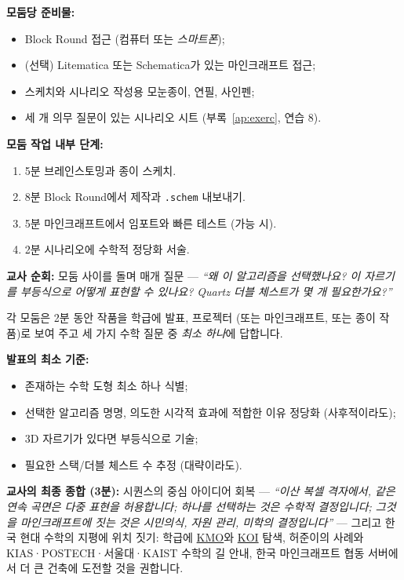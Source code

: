 \documentclass[12pt,a4paper]{scrartcl}
\newcommand{\tempo}[1]{\textnormal{\footnotesize\color{bg!90!white}\textsf{#1}}}
\begin{document}
\begin{hwaldong}[5.3 --- 제작 \quad\tempo{20분}]\label{at:53}
\textbf{모둠당 준비물:}
\begin{itemize}[leftmargin=1.3em,itemsep=0.15em,topsep=0.3em,nosep]
  \item Block Round 접근 (컴퓨터 또는 \emph{스마트폰});
  \item (선택) Litematica 또는 Schematica가 있는 마인크래프트 접근;
  \item 스케치와 시나리오 작성용 모눈종이, 연필, 사인펜;
  \item 세 개 의무 질문이 있는 시나리오 시트 (부록~\ref{ap:exerc}, 연습 8).
\end{itemize}

\textbf{모둠 작업 내부 단계:}
\begin{enumerate}[leftmargin=1.5em,itemsep=0.15em,topsep=0.3em,nosep]
  \item \tempo{5분} 브레인스토밍과 종이 스케치.
  \item \tempo{8분} Block Round에서 제작과 \texttt{.schem} 내보내기.
  \item \tempo{5분} 마인크래프트에서 임포트와 빠른 테스트 (가능 시).
  \item \tempo{2분} 시나리오에 수학적 정당화 서술.
\end{enumerate}

\textbf{교사 순회:} 모둠 사이를 돌며 매개 질문 --- \emph{\enquote{왜 이 알고리즘을 선택했나요? 이 자르기를 부등식으로 어떻게 표현할 수 있나요? Quartz 더블 체스트가 몇 개 필요한가요?}}
\end{hwaldong}

\begin{hwaldong}[5.4 --- 발표와 집단 종합 \quad\tempo{10분}]\label{at:54}
각 모둠은 2분 동안 작품을 학급에 발표, 프로젝터 (또는 마인크래프트, 또는 종이 작품)로 보여 주고 세 가지 수학 질문 중 \emph{최소 하나}에 답합니다.

\textbf{발표의 최소 기준:}
\begin{itemize}[leftmargin=1.3em,itemsep=0.1em,topsep=0.2em,nosep]
  \item 존재하는 수학 도형 최소 하나 식별;
  \item 선택한 알고리즘 명명, 의도한 시각적 효과에 적합한 이유 정당화 (사후적이라도);
  \item 3D 자르기가 있다면 부등식으로 기술;
  \item 필요한 스택/더블 체스트 수 추정 (대략이라도).
\end{itemize}

\textbf{교사의 최종 종합 (3분):} 시퀀스의 중심 아이디어 회복 --- \emph{\enquote{이산 복셀 격자에서, 같은 연속 곡면은 다중 표현을 허용합니다; 하나를 선택하는 것은 수학적 결정입니다; 그것을 마인크래프트에 짓는 것은 시민의식, 자원 관리, 미학의 결정입니다}} --- 그리고 한국 현대 수학의 지평에 위치 짓기: 학급에 \hyperref[sec:olympiad]{KMO}와 \hyperref[sec:olympiad]{KOI} 탐색, 허준이의 사례와 KIAS·POSTECH·서울대·KAIST 수학의 길 안내, 한국 마인크래프트 협동 서버에서 더 큰 건축에 도전할 것을 권합니다.
\end{hwaldong}
\end{document}
